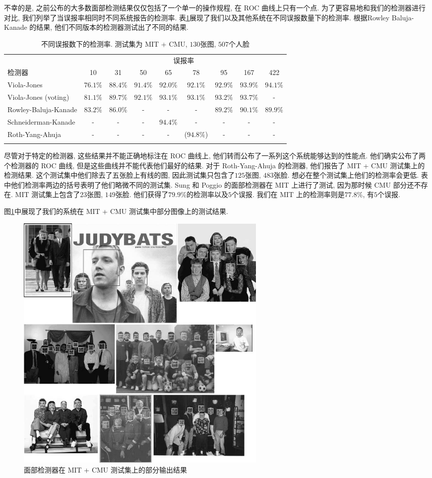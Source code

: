 \documentclass[a4paper,utf8,11pt]{ctexart}
\begin{document}
不幸的是, 之前公布的大多数面部检测结果仅仅包括了一个单一的操作规程, 在 ROC 曲线上只有一个点.
为了更容易地和我们的检测器进行对比, 我们列举了当误报率相同时不同系统报告的检测率. 表\ref{tab:false}展现了我们以及其他系统在不同误报数量下的检测率. 根据Rowley Baluja-Kanade 的结果\citep{rowley1998neural}, 他们不同版本的检测器测试出了不同的结果.
\begin{table}
\centering
\begin{tabular}{lcccccccc}
\firsthline
&\multicolumn{8}{c}{误报率} \\
\cline{2-9}
检测器 & 10 & 31 & 50 & 65 & 78 & 95 & 167 & 422 \\
\hline
Viola-Jones & $76.1\%$ & $88.4\%$ & $91.4\%$ & $92.0\%$ & $92.1\%$ & $92.9\%$ & $93.9\%$ & $94.1\%$ \\
Viola-Jones (voting) & $81.1\%$ & $89.7\%$ & $92.1\%$ & $93.1\%$ & $93.1\%$ & $93.2\%$ & $93.7\%$ & - \\
Rowley-Baluja-Kanade & $83.2\%$ & $86.0\%$ & - & - & - & $89.2\%$ & $90.1\%$ & $89.9\%$ \\
Schneiderman-Kanade & - & - & - & $94.4\%$ & - & - & - & - \\
Roth-Yang-Ahuja & - & - & - & - & ($94.8\%$) & - & - & - \\
\lasthline
\end{tabular}
\caption{不同误报数下的检测率. 测试集为 MIT + CMU, $130$张图, $507$个人脸}
\label{tab:false}
\end{table}
尽管对于特定的检测器, 这些结果并不能正确地标注在 ROC 曲线上, 他们转而公布了一系列这个系统能够达到的性能点. 他们确实公布了两个检测器的 ROC 曲线, 但是这些曲线并不能代表他们最好的结果. 
对于 Roth-Yang-Ahuja 的检测器\citep{yang2000snow}, 他们报告了 MIT + CMU 测试集上的检测结果. 这个测试集中他们除去了五张脸上有线的图, 因此测试集只包含了$125$张图, $483$张脸. 想必在整个测试集上他们的检测率会更低. 表中他们检测率两边的括号表明了他们略微不同的测试集.
Sung 和 Poggio 的面部检测器\citep{sung1998example}在 MIT 上进行了测试, 因为那时候 CMU 部分还不存在. MIT 测试集上包含了$23$张图, $149$张脸. 他们获得了$79.9\%$的检测率以及$5$个误报. 我们在 MIT 上的检测率则是$77.8\%$, 有$5$个误报.

图\ref{fig:output}中展现了我们的系统在 MIT + CMU 测试集中部分图像上的测试结果.
\begin{figure}[!b]
\centering
\includegraphics[width=0.6\textwidth]{output.png}
\caption{面部检测器在 MIT + CMU 测试集上的部分输出结果}
\label{fig:output}
\end{figure}
\end{document}
